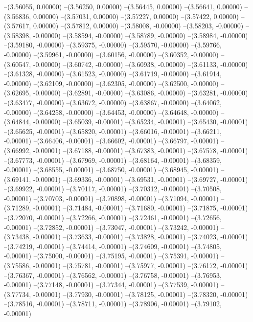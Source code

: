 --(3.56055, 0.00000)
--(3.56250, 0.00000)
--(3.56445, 0.00000)
--(3.56641, 0.00000)
--(3.56836, 0.00000)
--(3.57031, 0.00000)
--(3.57227, 0.00000)
--(3.57422, 0.00000)
--(3.57617, 0.00000)
--(3.57812, 0.00000)
--(3.58008, -0.00000)
--(3.58203, -0.00000)
--(3.58398, -0.00000)
--(3.58594, -0.00000)
--(3.58789, -0.00000)
--(3.58984, -0.00000)
--(3.59180, -0.00000)
--(3.59375, -0.00000)
--(3.59570, -0.00000)
--(3.59766, -0.00000)
--(3.59961, -0.00000)
--(3.60156, -0.00000)
--(3.60352, -0.00000)
--(3.60547, -0.00000)
--(3.60742, -0.00000)
--(3.60938, -0.00000)
--(3.61133, -0.00000)
--(3.61328, -0.00000)
--(3.61523, -0.00000)
--(3.61719, -0.00000)
--(3.61914, -0.00000)
--(3.62109, -0.00000)
--(3.62305, -0.00000)
--(3.62500, -0.00000)
--(3.62695, -0.00000)
--(3.62891, -0.00000)
--(3.63086, -0.00000)
--(3.63281, -0.00000)
--(3.63477, -0.00000)
--(3.63672, -0.00000)
--(3.63867, -0.00000)
--(3.64062, -0.00000)
--(3.64258, -0.00000)
--(3.64453, -0.00000)
--(3.64648, -0.00000)
--(3.64844, -0.00000)
--(3.65039, -0.00001)
--(3.65234, -0.00001)
--(3.65430, -0.00001)
--(3.65625, -0.00001)
--(3.65820, -0.00001)
--(3.66016, -0.00001)
--(3.66211, -0.00001)
--(3.66406, -0.00001)
--(3.66602, -0.00001)
--(3.66797, -0.00001)
--(3.66992, -0.00001)
--(3.67188, -0.00001)
--(3.67383, -0.00001)
--(3.67578, -0.00001)
--(3.67773, -0.00001)
--(3.67969, -0.00001)
--(3.68164, -0.00001)
--(3.68359, -0.00001)
--(3.68555, -0.00001)
--(3.68750, -0.00001)
--(3.68945, -0.00001)
--(3.69141, -0.00001)
--(3.69336, -0.00001)
--(3.69531, -0.00001)
--(3.69727, -0.00001)
--(3.69922, -0.00001)
--(3.70117, -0.00001)
--(3.70312, -0.00001)
--(3.70508, -0.00001)
--(3.70703, -0.00001)
--(3.70898, -0.00001)
--(3.71094, -0.00001)
--(3.71289, -0.00001)
--(3.71484, -0.00001)
--(3.71680, -0.00001)
--(3.71875, -0.00001)
--(3.72070, -0.00001)
--(3.72266, -0.00001)
--(3.72461, -0.00001)
--(3.72656, -0.00001)
--(3.72852, -0.00001)
--(3.73047, -0.00001)
--(3.73242, -0.00001)
--(3.73438, -0.00001)
--(3.73633, -0.00001)
--(3.73828, -0.00001)
--(3.74023, -0.00001)
--(3.74219, -0.00001)
--(3.74414, -0.00001)
--(3.74609, -0.00001)
--(3.74805, -0.00001)
--(3.75000, -0.00001)
--(3.75195, -0.00001)
--(3.75391, -0.00001)
--(3.75586, -0.00001)
--(3.75781, -0.00001)
--(3.75977, -0.00001)
--(3.76172, -0.00001)
--(3.76367, -0.00001)
--(3.76562, -0.00001)
--(3.76758, -0.00001)
--(3.76953, -0.00001)
--(3.77148, -0.00001)
--(3.77344, -0.00001)
--(3.77539, -0.00001)
--(3.77734, -0.00001)
--(3.77930, -0.00001)
--(3.78125, -0.00001)
--(3.78320, -0.00001)
--(3.78516, -0.00001)
--(3.78711, -0.00001)
--(3.78906, -0.00001)
--(3.79102, -0.00001)
